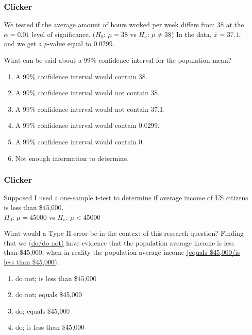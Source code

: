 \begin{frame}
\frametitle{Clicker}
We tested if the average amount of hours worked per week differs from 38 at the $\alpha=0.01$ level of significance. ($H_0$: $\mu=38$ vs $H_a$: $\mu \neq 38$) In the data, $\bar{x}=37.1$, and we get a $p$-value equal to 0.0299.
\begin{clicker}{What can be said about a 99\% confidence interval for the population mean?}
\begin{enumerate}
  \item
  A 99\% confidence interval would contain 38.
  \item
  A 99\% confidence interval would not contain 38.
  \item
  A 99\% confidence interval would not contain 37.1.
  \item
  A 99\% confidence interval would contain 0.0299.
  \item
  A 99\% confidence interval would contain 0.
  \item
  Not enough information to determine.
\end{enumerate}
\end{clicker}
\end{frame}

\begin{frame}
\frametitle{Clicker}
Supposed I used a one-sample t-test to determine if average income of US citizens is less than \$45,000. \\
$H_0$: $\mu=45000$ vs $H_a$: $\mu < 45000$
\begin{clicker}{What would a Type II error be in the context of this research question?  Finding that we \underline{(do/do not)} have evidence that the population average income is less than \$45,000, when in reality the population average income \underline{(equals \$45,000/is less than \$45,000)}.}
\begin{enumerate}
    \item
    do not; is less than \$45,000
    \item
    do not; equals \$45,000
    \item
    do; equals \$45,000
    \item
    do; is less than \$45,000
\end{enumerate}
\end{clicker}
\end{frame}

 